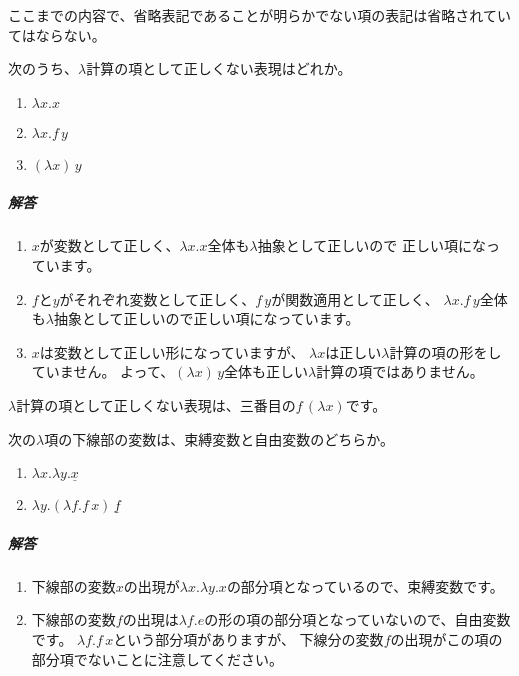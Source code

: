 \begin{note}
ここまでの内容で、省略表記であることが明らかでない項の表記は省略されていてはならない。
\end{note}

\begin{exercise}

次のうち、$\lambda$計算の項として正しくない表現はどれか。

\begin{enumerate}
  \item$\lambda x . x$
  \item$\lambda x . f \, y$
  \item$(\lambda x) \, y$
\end{enumerate}

\subparagraph{解答}

\begin{enumerate}
  \item $x$が変数として正しく、$\lambda x . x$全体も$\lambda$抽象として正しいので
        正しい項になっています。
  \item $f$と$y$がそれぞれ変数として正しく、$f \, y$が関数適用として正しく、
        $\lambda x . f \, y$全体も$\lambda$抽象として正しいので正しい項になっています。
  \item $x$は変数として正しい形になっていますが、
        $\lambda x$は正しい$\lambda$計算の項の形をしていません。
        よって、$(\lambda x) \, y$全体も正しい$\lambda$計算の項ではありません。
\end{enumerate}

$\lambda$計算の項として正しくない表現は、三番目の$f \, (\lambda x)$です。

\end{exercise}

\begin{exercise}

次の$\lambda$項の下線部の変数は、束縛変数と自由変数のどちらか。

\begin{enumerate}
  \item$\lambda x . \lambda y . \underline{x}$
  \item$\lambda y . (\lambda f . f \, x) \, \underline{f}$
\end{enumerate}

\subparagraph{解答}

\begin{enumerate}
  \item 下線部の変数$x$の出現が$\lambda x . \lambda y . x$の部分項となっているので、束縛変数です。
  \item 下線部の変数$f$の出現は$\lambda f . e$の形の項の部分項となっていないので、自由変数です。
       $\lambda f . f \, x$という部分項がありますが、
        下線分の変数$f$の出現がこの項の部分項でないことに注意してください。
\end{enumerate}

\end{exercise}


